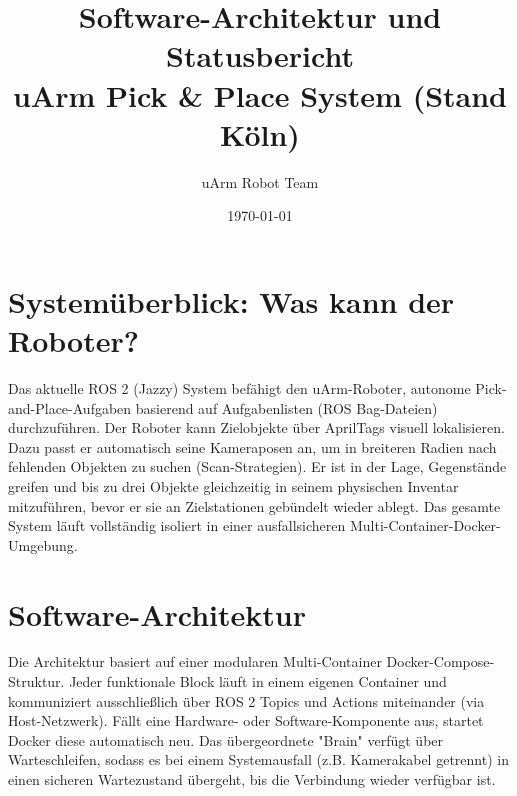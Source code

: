 \documentclass[12pt,a4paper]{article}
\title{Software-Architektur und Statusbericht\\ uArm Pick \& Place System (Stand Köln)}
\author{uArm Robot Team}
\date{\today}
\begin{document}
\maketitle

\section{Systemüberblick: Was kann der Roboter?}
Das aktuelle ROS 2 (Jazzy) System befähigt den uArm-Roboter, autonome Pick-and-Place-Aufgaben basierend auf Aufgabenlisten (ROS Bag-Dateien) durchzuführen. Der Roboter kann Zielobjekte über AprilTags visuell lokalisieren. Dazu passt er automatisch seine Kameraposen an, um in breiteren Radien nach fehlenden Objekten zu suchen (Scan-Strategien). Er ist in der Lage, Gegenstände greifen und bis zu drei Objekte gleichzeitig in seinem physischen Inventar mitzuführen, bevor er sie an Zielstationen gebündelt wieder ablegt. Das gesamte System läuft vollständig isoliert in einer ausfallsicheren Multi-Container-Docker-Umgebung.

\section{Software-Architektur}
Die Architektur basiert auf einer modularen Multi-Container Docker-Compose-Struktur. Jeder funktionale Block läuft in einem eigenen Container und kommuniziert ausschließlich über ROS 2 Topics und Actions miteinander (via Host-Netzwerk). Fällt eine Hardware- oder Software-Komponente aus, startet Docker diese automatisch neu. Das übergeordnete "Brain" verfügt über Warteschleifen, sodass es bei einem Systemausfall (z.B. Kamerakabel getrennt) in einen sicheren Wartezustand übergeht, bis die Verbindung wieder verfügbar ist.
\end{document}
